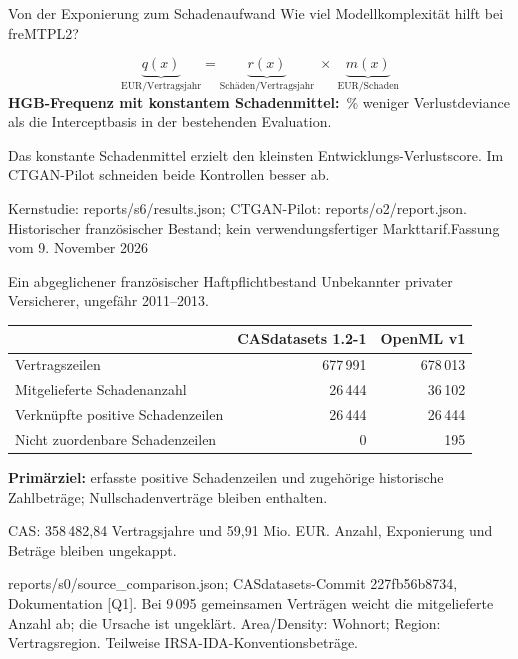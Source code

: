 \documentclass[aspectratio=169,11pt]{beamer}
\newcommand{\source}[1]{\vfill{\fontsize{6.5}{7.4}\selectfont\color{muted}#1\par}}
\begin{document}
\ifdefined\BackupOnly\else

\begin{frame}[t]{Von der Exponierung zum Schadenaufwand}
\vspace{3mm}
{\large Wie viel Modellkomplexität hilft bei freMTPL2?}\par
\medskip
\[
\underbrace{q(x)}_{\text{EUR/Vertragsjahr}}
=\underbrace{r(x)}_{\text{Schäden/Vertragsjahr}}
\;\times\;
\underbrace{m(x)}_{\text{EUR/Schaden}}
\]
\medskip
\textbf{HGB-Frequenz mit konstantem Schadenmittel:}
\EvalGain\,\% weniger Verlustdeviance als die Interceptbasis
in der bestehenden Evaluation.
\medskip

Das konstante Schadenmittel erzielt den kleinsten Entwicklungs-Verlustscore.
Im CTGAN-Pilot schneiden beide Kontrollen besser ab.
\source{Kernstudie: reports/s6/results.json; CTGAN-Pilot: reports/o2/report.json.\quad
Historischer französischer Bestand; kein verwendungsfertiger Markttarif.\quad Fassung vom 9. November 2026}
\end{frame}

\begin{frame}[t]{Ein abgeglichener französischer Haftpflichtbestand}
Unbekannter privater Versicherer, ungefähr 2011--2013.\par
\medskip
\begin{center}
\begin{tabular}{lrr}\toprule
& CASdatasets 1.2-1 & OpenML v1\\\midrule
Vertragszeilen & 677\,991 & 678\,013\\
Mitgelieferte Schadenanzahl & 26\,444 & 36\,102\\
Verknüpfte positive Schadenzeilen & 26\,444 & 26\,444\\
Nicht zuordenbare Schadenzeilen & 0 & 195\\\bottomrule
\end{tabular}
\end{center}
\medskip
\textbf{Primärziel:} erfasste positive Schadenzeilen und zugehörige
historische Zahlbeträge; Nullschadenverträge bleiben enthalten.
\smallskip

CAS: 358\,482,84 Vertragsjahre und 59,91 Mio. EUR.
Anzahl, Exponierung und Beträge bleiben ungekappt.
\source{reports/s0/source\_comparison.json; CASdatasets-Commit 227fb56b8734, Dokumentation [Q1].
Bei 9\,095 gemeinsamen Verträgen weicht die mitgelieferte Anzahl ab; die Ursache ist ungeklärt.
Area/Density: Wohnort; Region: Vertragsregion. Teilweise IRSA-IDA-Konventionsbeträge.}
\end{frame}
\end{document}
